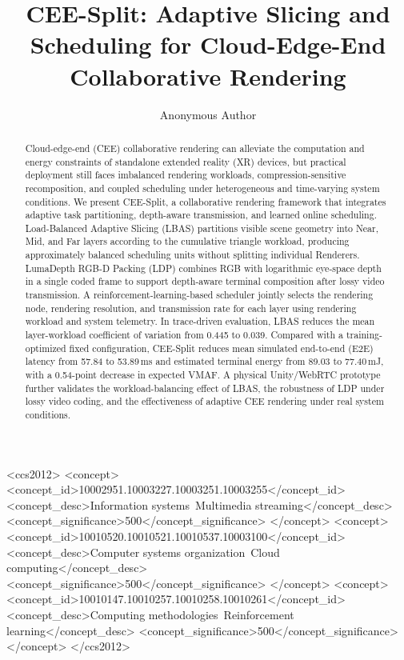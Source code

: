 \documentclass[acmsmall]{acmart}
\begin{document}
	
	\title{CEE-Split: Adaptive Slicing and Scheduling for
		Cloud-Edge-End Collaborative Rendering}
	
	\author{Anonymous Author}
	
\begin{abstract}
	Cloud-edge-end (CEE) collaborative rendering can alleviate the computation and energy constraints of standalone extended reality (XR) devices, but practical deployment still faces imbalanced rendering workloads, compression-sensitive recomposition, and coupled scheduling under heterogeneous and time-varying system conditions. We present CEE-Split, a collaborative rendering framework that integrates adaptive task partitioning, depth-aware transmission, and learned online scheduling. Load-Balanced Adaptive Slicing (LBAS) partitions visible scene geometry into Near, Mid, and Far layers according to the cumulative triangle workload, producing approximately balanced scheduling units without splitting individual Renderers. LumaDepth RGB-D Packing (LDP) combines RGB with logarithmic eye-space depth in a single coded frame to support depth-aware terminal composition after lossy video transmission. A reinforcement-learning-based scheduler jointly selects the rendering node, rendering resolution, and transmission rate for each layer using rendering workload and system telemetry. In trace-driven evaluation, LBAS reduces the mean layer-workload coefficient of variation from 0.445 to 0.039. Compared with a training-optimized fixed configuration, CEE-Split reduces mean simulated end-to-end (E2E) latency from 57.84 to 53.89\,ms and estimated terminal energy from 89.03 to 77.40\,mJ, with a 0.54-point decrease in expected VMAF. A physical Unity/WebRTC prototype further validates the workload-balancing effect of LBAS, the robustness of LDP under lossy video coding, and the effectiveness of adaptive CEE rendering under real system conditions.
\end{abstract}


\begin{CCSXML}
<ccs2012>
   <concept>
       <concept_id>10002951.10003227.10003251.10003255</concept_id>
       <concept_desc>Information systems~Multimedia streaming</concept_desc>
       <concept_significance>500</concept_significance>
   </concept>
   <concept>
       <concept_id>10010520.10010521.10010537.10003100</concept_id>
       <concept_desc>Computer systems organization~Cloud computing</concept_desc>
       <concept_significance>500</concept_significance>
   </concept>
   <concept>
       <concept_id>10010147.10010257.10010258.10010261</concept_id>
       <concept_desc>Computing methodologies~Reinforcement learning</concept_desc>
       <concept_significance>500</concept_significance>
   </concept>
</ccs2012>
\end{CCSXML}
\end{document}
